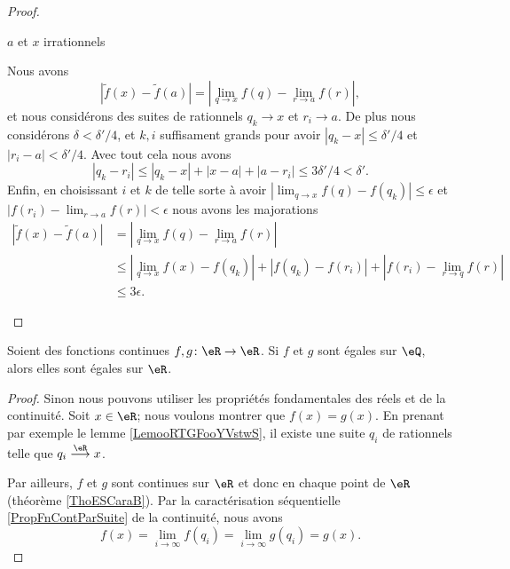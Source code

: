 \begin{proof}
\begin{subproof}
\begin{subproof}
			\item[\( a\) et \( x\) irrationnels]

			Nous avons
			\begin{equation}
				| \tilde f(x)-\tilde f(a) |=| \lim_{q\to x} f(q)-\lim_{r\to a} f(r) |,
			\end{equation}
			et nous considérons des suites de rationnels \( q_k\to x\) et \( r_i\to a\). De plus nous considérons \( \delta<\delta'/4\), et \( k,i\) suffisament grands pour avoir \( | q_k-x |\leq \delta'/4\) et \( | r_i-a |<\delta'/4\). Avec tout cela nous avons
			\begin{equation}
				| q_k-r_i |\leq | q_k-x |+| x-a |+| a-r_i |\leq 3\delta'/4<\delta'.
			\end{equation}
			Enfin, en choisissant \( i\) et \( k\) de telle sorte à avoir \( | \lim_{q\to x} f(q)-f(q_k) |\leq \epsilon\) et \( | f(r_i)-\lim_{r\to a} f(r) |<\epsilon\) nous avons les majorations
			\begin{subequations}
				\begin{align}
					| \tilde f(x)-\tilde f(a) | & =| \lim_{q\to x} f(q)-\lim_{r\to a} f(r) |                                         \\
					                            & \leq | \lim_{q\to x} f(x)-f(q_k) |+| f(q_k)-f(r_i) |+| f(r_i)-\lim_{r\to q} f(r) | \\
					                            & \leq 3\epsilon.
				\end{align}
			\end{subequations}
		\end{subproof}

	\end{subproof}
\end{proof}

\begin{proposition}     \label{PROPooXWHYooFiVYfi}
	Soient des fonctions continues \( f,g\colon \eR\to \eR\). Si \( f\) et \( g\) sont égales sur \( \eQ\), alors elles sont égales sur \( \eR\).
\end{proposition}

\begin{proof}
	Sinon nous pouvons utiliser les propriétés fondamentales des réels et de la continuité. Soit \( x\in \eR\); nous voulons montrer que \( f(x)=g(x)\). En prenant par exemple le lemme \ref{LemooRTGFooYVstwS}, il existe une suite \( q_i\) de rationnels telle que \( q_i\stackrel{\eR}{\longrightarrow}x\).

	Par ailleurs, \( f\) et \( g\) sont continues sur \( \eR\) et donc en chaque point de \( \eR\) (théorème \ref{ThoESCaraB}). Par la caractérisation séquentielle \ref{PropFnContParSuite} de la continuité, nous avons
	\begin{equation}
		f(x)=\lim_{i\to \infty} f(q_i)=\lim_{i\to \infty} g(q_i)=g(x).
	\end{equation}
\end{proof}


